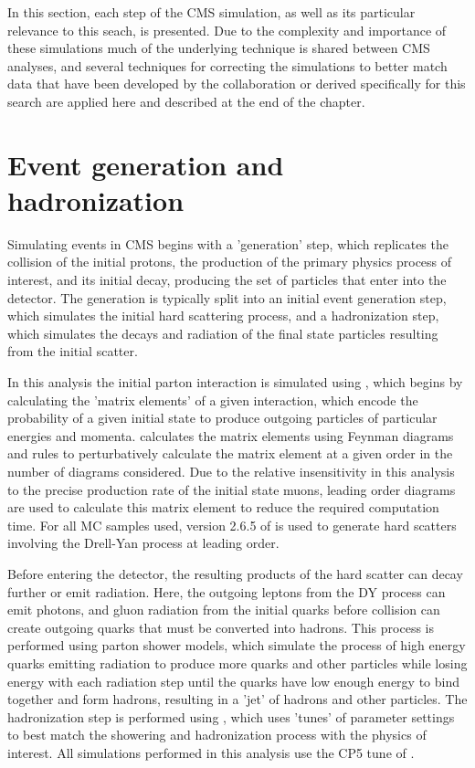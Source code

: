 In this section, each step of the CMS simulation, as well as its particular relevance to this seach, is presented.
Due to the complexity and importance of these simulations much of the underlying technique is shared between CMS analyses, and several techniques for correcting the simulations to better match data that have been developed by the collaboration or derived specifically for this search are applied here and described at the end of the chapter. 

\section{Event generation and hadronization}
Simulating events in CMS begins with a 'generation' step, which replicates the collision of the initial protons, the production of the primary physics process of interest, and its initial decay, producing the set of particles that enter into the detector. 
The generation is typically split into an initial event generation step, which simulates the initial hard scattering process, and a hadronization step, which simulates the decays and radiation of the final state particles resulting from the initial scatter.

In this analysis the initial parton interaction is simulated using \mg \cite{Maltoni_2003}, which begins by calculating the 'matrix elements' of a given interaction, which encode the probability of a given initial state to produce outgoing particles of particular energies and momenta.
\mg calculates the matrix elements using Feynman diagrams and rules to perturbatively calculate the matrix element at a given order in the number of diagrams considered.
Due to the relative insensitivity in this analysis to the precise production rate of the initial state muons, leading order diagrams are used to calculate this matrix element to reduce the required computation time.
For all MC samples used, version 2.6.5 of \mg is used to generate hard scatters involving the Drell-Yan process at leading order. 

Before entering the detector, the resulting products of the hard scatter can decay further or emit radiation.
Here, the outgoing leptons from the DY process can emit photons, and gluon radiation from the initial quarks before collision can create outgoing quarks that must be converted into hadrons. 
This process is performed using parton shower models, which simulate the process of high energy quarks emitting radiation to produce more quarks and other particles while losing energy with each radiation step until the quarks have low enough energy to bind together and form hadrons, resulting in a 'jet' of hadrons and other particles.
The hadronization step is performed using \pythia, which uses 'tunes' of parameter settings to best match the showering and hadronization process with the physics of interest. 
All simulations performed in this analysis use the CP5 tune of \pythia \cite{pythia_tune}. 


